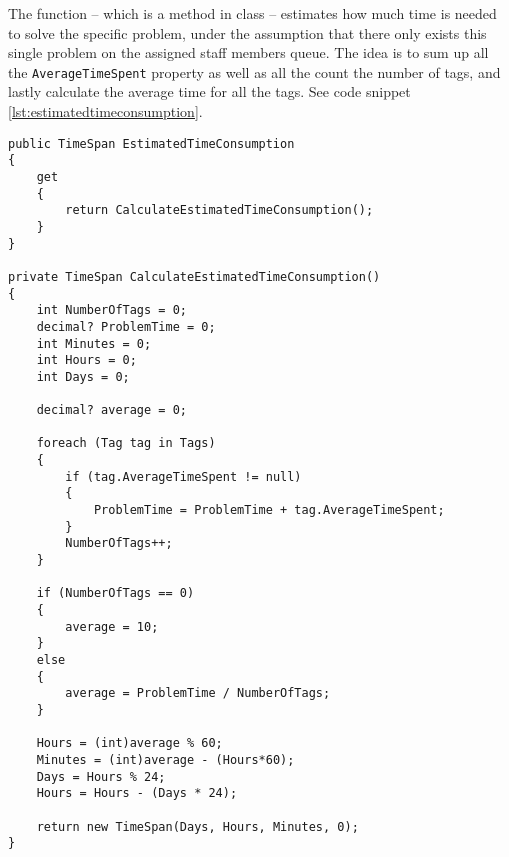 \label{sec:estimated_time_consumption}

The  function -- which is a method in  class -- estimates how much time is needed to solve the specific problem, under the assumption that there only exists this single problem on the assigned staff members queue. The idea is to sum up all the \verb+AverageTimeSpent+ property as well as all the count the number of tags, and lastly calculate the average time for all the tags. See code snippet \ref{lst:estimatedtimeconsumption}.

\begin{lstlisting}[style=sourceCode, caption=\myCaption{The ManageTagTimes method}, label=lst:estimatedtimeconsumption]
public TimeSpan EstimatedTimeConsumption
{
    get
    {
        return CalculateEstimatedTimeConsumption();
    }
}

private TimeSpan CalculateEstimatedTimeConsumption()
{
    int NumberOfTags = 0;
    decimal? ProblemTime = 0;
    int Minutes = 0;
    int Hours = 0;
    int Days = 0;

    decimal? average = 0;

    foreach (Tag tag in Tags)
    {
        if (tag.AverageTimeSpent != null)
        {
            ProblemTime = ProblemTime + tag.AverageTimeSpent;
        }
        NumberOfTags++;
    }

    if (NumberOfTags == 0)
    {
        average = 10;
    }
    else
    {
        average = ProblemTime / NumberOfTags;
    }

    Hours = (int)average % 60;
    Minutes = (int)average - (Hours*60);
    Days = Hours % 24;
    Hours = Hours - (Days * 24);

    return new TimeSpan(Days, Hours, Minutes, 0);
}
\end{lstlisting}